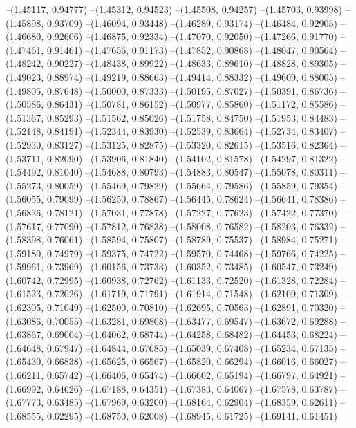 --(1.45117, 0.94777)
--(1.45312, 0.94523)
--(1.45508, 0.94257)
--(1.45703, 0.93998)
--(1.45898, 0.93709)
--(1.46094, 0.93448)
--(1.46289, 0.93174)
--(1.46484, 0.92905)
--(1.46680, 0.92606)
--(1.46875, 0.92334)
--(1.47070, 0.92050)
--(1.47266, 0.91770)
--(1.47461, 0.91461)
--(1.47656, 0.91173)
--(1.47852, 0.90868)
--(1.48047, 0.90564)
--(1.48242, 0.90227)
--(1.48438, 0.89922)
--(1.48633, 0.89610)
--(1.48828, 0.89305)
--(1.49023, 0.88974)
--(1.49219, 0.88663)
--(1.49414, 0.88332)
--(1.49609, 0.88005)
--(1.49805, 0.87648)
--(1.50000, 0.87333)
--(1.50195, 0.87027)
--(1.50391, 0.86736)
--(1.50586, 0.86431)
--(1.50781, 0.86152)
--(1.50977, 0.85860)
--(1.51172, 0.85586)
--(1.51367, 0.85293)
--(1.51562, 0.85026)
--(1.51758, 0.84750)
--(1.51953, 0.84483)
--(1.52148, 0.84191)
--(1.52344, 0.83930)
--(1.52539, 0.83664)
--(1.52734, 0.83407)
--(1.52930, 0.83127)
--(1.53125, 0.82875)
--(1.53320, 0.82615)
--(1.53516, 0.82364)
--(1.53711, 0.82090)
--(1.53906, 0.81840)
--(1.54102, 0.81578)
--(1.54297, 0.81322)
--(1.54492, 0.81040)
--(1.54688, 0.80793)
--(1.54883, 0.80547)
--(1.55078, 0.80311)
--(1.55273, 0.80059)
--(1.55469, 0.79829)
--(1.55664, 0.79586)
--(1.55859, 0.79354)
--(1.56055, 0.79099)
--(1.56250, 0.78867)
--(1.56445, 0.78624)
--(1.56641, 0.78386)
--(1.56836, 0.78121)
--(1.57031, 0.77878)
--(1.57227, 0.77623)
--(1.57422, 0.77370)
--(1.57617, 0.77090)
--(1.57812, 0.76838)
--(1.58008, 0.76582)
--(1.58203, 0.76332)
--(1.58398, 0.76061)
--(1.58594, 0.75807)
--(1.58789, 0.75537)
--(1.58984, 0.75271)
--(1.59180, 0.74979)
--(1.59375, 0.74722)
--(1.59570, 0.74468)
--(1.59766, 0.74225)
--(1.59961, 0.73969)
--(1.60156, 0.73733)
--(1.60352, 0.73485)
--(1.60547, 0.73249)
--(1.60742, 0.72995)
--(1.60938, 0.72762)
--(1.61133, 0.72520)
--(1.61328, 0.72284)
--(1.61523, 0.72026)
--(1.61719, 0.71791)
--(1.61914, 0.71548)
--(1.62109, 0.71309)
--(1.62305, 0.71049)
--(1.62500, 0.70810)
--(1.62695, 0.70563)
--(1.62891, 0.70320)
--(1.63086, 0.70055)
--(1.63281, 0.69808)
--(1.63477, 0.69547)
--(1.63672, 0.69288)
--(1.63867, 0.69004)
--(1.64062, 0.68744)
--(1.64258, 0.68482)
--(1.64453, 0.68224)
--(1.64648, 0.67947)
--(1.64844, 0.67685)
--(1.65039, 0.67408)
--(1.65234, 0.67135)
--(1.65430, 0.66838)
--(1.65625, 0.66567)
--(1.65820, 0.66294)
--(1.66016, 0.66027)
--(1.66211, 0.65742)
--(1.66406, 0.65474)
--(1.66602, 0.65194)
--(1.66797, 0.64921)
--(1.66992, 0.64626)
--(1.67188, 0.64351)
--(1.67383, 0.64067)
--(1.67578, 0.63787)
--(1.67773, 0.63485)
--(1.67969, 0.63200)
--(1.68164, 0.62904)
--(1.68359, 0.62611)
--(1.68555, 0.62295)
--(1.68750, 0.62008)
--(1.68945, 0.61725)
--(1.69141, 0.61451)
